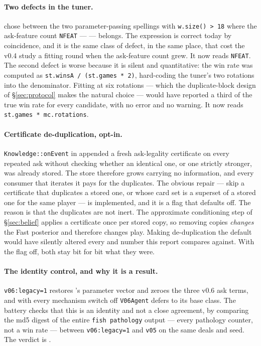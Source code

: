 \paragraph{Two defects in the tuner.}
 chose between the two parameter-passing spellings
with \verb|w.size() > 18| where the ask-feature count \verb|NFEAT| ---
\numAskFeats{} --- belongs. The expression is correct today by coincidence, and
it is the same class of defect, in the same place, that cost the v0.4 study a
fitting round when the ask-feature count grew. It now reads \verb|NFEAT|. The
second defect is worse because it is silent and quantitative: the win rate was
computed as \verb|st.winsA / (st.games * 2)|, hard-coding the tuner's two
rotations into the denominator. Fitting at six rotations --- which the
duplicate-block design of \S\ref{sec:protocol} makes the natural choice --- would
have reported a third of the true win rate for every candidate, with no error and
no warning. It now reads \verb|st.games * mc.rotations|.

\paragraph{Certificate de-duplication, opt-in.}
\texttt{Knowledge::onEvent} in  appended a fresh
ask-legality certificate on every repeated ask without checking whether an
identical one, or one strictly stronger, was already stored. The store therefore
grows carrying no information, and every consumer that iterates it pays for the
duplicates. The obvious repair --- skip a certificate that duplicates a stored
one, or whose card set is a superset of a stored one for the same player --- is
implemented, and it is a flag that defaults off. The reason is that the
duplicates are not inert. The approximate conditioning step of
\S\ref{sec:belief} applies a certificate once per stored copy, so removing
copies \emph{changes} the Fast posterior and therefore changes play. Making
de-duplication the default would have silently altered every \vfour{} and
\vfive{} number this report compares against. With the flag off, both stay bit
for bit what they were.

\paragraph{The identity control, and why it is a result.}
\texttt{v06:legacy=1} restores \vfive{}'s parameter vector and zeroes the three
v0.6 ask terms, and with every mechanism switch off \texttt{V06Agent} defers to
its base class. The battery checks that this is an identity and not a close
agreement, by comparing the md5 digest of the entire \texttt{fish pathology}
output --- every pathology counter, not a win rate --- between
\texttt{v06:legacy=1} and \texttt{v05} on the same deals and seed. The verdict is
\vsixIdentity{}.

